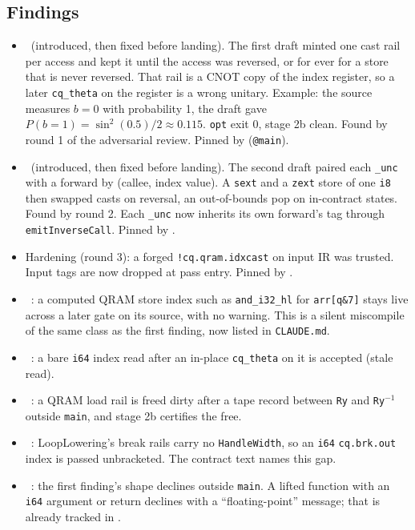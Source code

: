 \subsection*{Findings}
\begin{itemize}
  \item \fconfirmed\ (introduced, then fixed before landing). The first draft
  minted one cast rail per access and kept it until the access was reversed,
  or for ever for a store that is never reversed. That rail is a CNOT copy of
  the index register, so a later \texttt{cq\_theta} on the register is a wrong
  unitary. Example: the source measures $b=0$ with probability 1, the draft gave
  $P(b=1)=\sin^2(0.5)/2\approx0.115$. \texttt{opt} exit 0, stage 2b clean.
  Found by round 1 of the adversarial review. Pinned by
   (\texttt{@main}).
  \item \fconfirmed\ (introduced, then fixed before landing). The second draft
  paired each \texttt{\_unc} with a forward by (callee, index value). A
  \texttt{sext} and a \texttt{zext} store of one \texttt{i8} then swapped casts
  on reversal, an out-of-bounds pop on in-contract states. Found by round 2.
  Each \texttt{\_unc} now inherits its own forward's tag through
  \texttt{emitInverseCall}. Pinned by .
  \item Hardening (round 3): a forged \texttt{!cq.qram.idxcast} on input IR was
  trusted. Input tags are now dropped at pass entry. Pinned by
  .
  \item \fpreexisting\ : a computed QRAM store
  index such as \texttt{and\_i32\_hl} for \texttt{arr[q\&7]} stays live across a
  later gate on its source, with no warning. This is a silent miscompile of the
  same class as the first finding, now listed in \texttt{CLAUDE.md}.
  \item \fpreexisting\ : a bare \texttt{i64} index read
  after an in-place \texttt{cq\_theta} on it is accepted (stale read).
  \item \fpreexisting\ : a QRAM load rail is freed
  dirty after a tape record between \texttt{Ry} and \texttt{Ry}$^{-1}$ outside
  \texttt{main}, and stage 2b certifies the free.
  \item \fpreexisting\ : LoopLowering's break rails
  carry no \texttt{HandleWidth}, so an \texttt{i64} \texttt{cq.brk.out} index is
  passed unbracketed. The contract text names this gap.
  \item \foverdecline\ : the first finding's shape
  declines outside \texttt{main}. A lifted function with an \texttt{i64}
  argument or return declines with a ``floating-point'' message; that is
  already tracked in .
\end{itemize}

